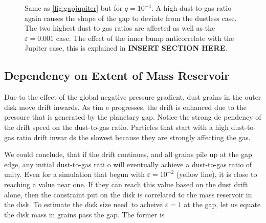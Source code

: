 \documentclass[onecolumn]{report}
\newcommand{\epsi}{\varepsilon}
\begin{document}
\begin{figure}
  \begin{center}
  \end{center}
  \caption{Same as \ref{fig:gapjupiter} but for $q=10^{-4}$. A high dust-to-gas ratio again causes the shape of the gap to deviate from the dustless case. The two highest dust to gas ratios are affected as well as the $\varepsilon=0.001$ case. The effect of the inner bump anticorrelate with the Jupiter case, this is explained in \textbf{INSERT SECTION HERE}.}
  \label{fig:gapneptune}
\end{figure}


\subsection{Dependency on Extent of Mass Reservoir}

Due to the effect of the global negative pressure gradient, dust grains in the outer disk move drift inwards. As tim
e progresses, the drift is enhanced due to the pressure that is generated by the planetary gap. Notice the strong de
pendency of the drift speed on the dust-to-gas ratio. Particles that start with a high dust-to-gas ratio drift inwar
ds the slowest because they are strongly affecting the gas.\par

We could conclude, that if the drift continues, and all grains pile up at the gap edge, any initial dust-to-gas rati
o will eventually achieve a dust-to-gas ratio of unity. Even for a simulation that begun with $\varepsilon=10^{-2}$ 
(yellow line), it is close to reaching a value near one. If they can reach this value based on the dust drift alone,
then the constraint put on the disk is correlated to the mass reservoir in the disk. To estimate the disk size need\
to acheive $\epsi=1$ at the gap, let us equate the disk mass in grains pass the gap. The former is
\end{document}
